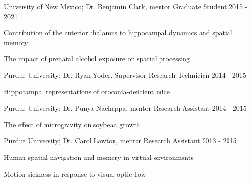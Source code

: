

\begin{cventries}

  \cventry
    {University of New Mexico; Dr. Benjamin Clark, mentor} %
    {Graduate Student} %
    {} %
    {2015 - 2021} %
    {
      \begin{cvitems} %
        \item {Contribution of the anterior thalamus to hippocampal dynamics and spatial memory}
        \item {The impact of prenatal alcohol exposure on spatial processing}
      \end{cvitems}
    }

  \cventry
    {Purdue University; Dr. Ryan Yoder, Supervisor} %
    {Research Technician} %
    {} %
    {2014 - 2015} %
    {
      \begin{cvitems} %
        \item {Hippocampal representations of otoconia-deficient mice}
      \end{cvitems}
    }
    
   \cventry
    {Purdue University; Dr. Punya Nachappa, mentor} %
    {Research Assistant} %
    {} %
    {2014 - 2015} %
    {
      \begin{cvitems} %
        \item {The effect of microgravity on soybean growth}
      \end{cvitems}
    }
    
  \cventry
    {Purdue University; Dr. Carol Lawton, mentor} %
    {Research Assistant} %
    {} %
    {2013 - 2015} %
    {
      \begin{cvitems} %
        \item {Human spatial navigation and memory in virtual environments}
        \item {Motion sickness in response to visual optic flow}
      \end{cvitems}
    }    
    

\end{cventries}
